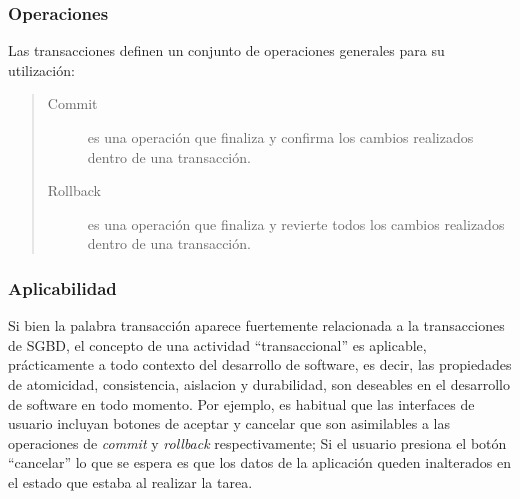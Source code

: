 \subsubsection{Operaciones}
	Las transacciones definen un conjunto de operaciones generales para su
	utilización:
	
	\begin{quote}
		\begin{description}
				\item[Commit] es una operación que finaliza  y confirma los
				cambios realizados dentro de una transacción. 
				
				\item[Rollback] es una operación que finaliza y revierte todos los cambios
				realizados dentro de una transacción.
				 
		\end{description}
	\end{quote}
	
\subsubsection{Aplicabilidad}
	Si bien la palabra transacción aparece fuertemente relacionada a la
	transacciones de SGBD, el concepto de una actividad ``transaccional'' es
	aplicable, prácticamente a todo contexto del desarrollo de software, es decir,
	las propiedades de atomicidad, consistencia, aislacion y durabilidad, son
	deseables en el desarrollo de software en todo momento. Por ejemplo, es
	habitual que las interfaces de usuario incluyan botones de aceptar y cancelar
	que son asimilables a las operaciones de \emph{commit} y \emph{rollback}
	respectivamente; Si el usuario presiona el botón ``cancelar'' lo que se espera
	es que los datos de la aplicación queden inalterados en el estado que estaba al
	realizar la tarea.
